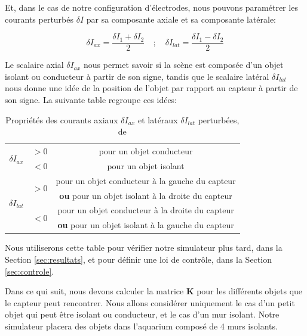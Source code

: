 Et, dans le cas de notre configuration d'électrodes, nous pouvons paramétrer les courants perturbés $\delta I$ par sa composante axiale et sa composante latérale: 

\begin{equation}\label{eq:axial_lateral}
    \delta I_{ax} = \frac{\delta I_1 + \delta I_2}{2} \quad ; \quad \delta I_{lat} = \frac{\delta I_1 - \delta I_2}{2}
\end{equation}

Le scalaire axial $\delta I_{ax}$ nous permet savoir si la scène est composée d'un objet isolant ou conducteur à partir de son signe, tandis que le scalaire latéral $\delta I_{lat}$ nous donne une idée de la position de l'objet par rapport au capteur à partir de son signe. La suivante table regroupe ces idées: 

\begin{table}[h!]
    \centering
    \begin{tabular}{|c|c|c|}
        \hline
        \multirow{2}{*}{$\delta I_{ax}$} & $>0$ & pour un objet conducteur\\ \cline{2-3}
         & $<0$& pour un objet isolant \\
         \hline
         \multirow{4}{*}{$\delta I_{lat}$} & \multirow{2}{*}{$>0$} & pour un objet conducteur à la gauche du capteur \\
          & & \textbf{ou} pour un objet isolant à la droite du capteur \\ \cline{2-3}
          & \multirow{2}{*}{$<0$} & pour un objet conducteur à la droite du capteur \\
          & & \textbf{ou} pour un objet isolant à la gauche du capteur \\
          \hline
    \end{tabular}
    \caption{Propriétés des courants axiaux $\delta I_{ax}$ et latéraux $\delta I_{lat}$ perturbées, de \cite{Boyer2013}}
    \label{tab:proprietes}
\end{table}

Nous utiliserons cette table pour vérifier notre simulateur plus tard, dans la Section \ref{sec:resultats}, et pour définir une loi de contrôle, dans la Section \ref{sec:controle}.

Dans ce qui suit, nous devons calculer la matrice $\mathbf{K}$ pour les différents objets que le capteur peut rencontrer. Nous allons considérer uniquement le cas d'un petit objet qui peut être isolant ou conducteur, et le cas d'un mur isolant. Notre simulateur placera des objets dans l'aquarium composé de 4 murs isolants. 

